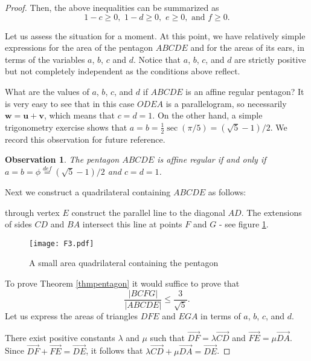 \documentclass [10pt,oneside]{amsart}
\theoremstyle{definition}
\theoremstyle{plain}
\newtheorem{obs}[df]{Observation}
\newcounter{exercise}
\begin{document}
\begin{proof}
Then, the above inequalities can be summarized as
\begin{equation}\label{cdef}
1-c\ge 0, \,\,1-d\ge 0,\,\,e\ge 0,\,\,\text{and}\,\, f\ge 0.
\end{equation}

Let us assess the situation for a moment. At this point, we have relatively simple expressions for the
area of the pentagon $ABCDE$ and for the areas of its ears, in terms of the variables $a$, $b$, $c$ and $d$.
Notice that $a$, $b$, $c$, and $d$ are strictly positive but not completely independent as the conditions above reflect.

What are the values of $a$, $b$, $c$, and $d$ if $ABCDE$ is an affine regular pentagon? It is very easy to see that in this case $ODEA$ is a parallelogram, so necessarily $\mathbf{w}=\mathbf{u}+\mathbf{v}$, which means that $c=d=1$.
On the other hand, a simple trigonometry exercise shows that $a=b=\frac{1}{2}\sec(\pi/5)=(\sqrt{5}-1)/2$.
We record this observation for future reference.
\begin{obs}\label{extremum}
The pentagon $ABCDE$ is affine regular if and only if $a=b=\phi\overset{def}{=}(\sqrt{5}-1)/2$ and $c=d=1$.
\end{obs}

Next we construct a quadrilateral containing $ABCDE$ as follows: 

through vertex $E$ construct the parallel line to the diagonal $AD$. 
The extensions of sides $CD$ and $BA$ intersect this line at points $F$ and $G$ - see figure \ref{fig3}.
\begin{figure}[ht]
\centering
\texttt{[image: F3.pdf]}
\vspace{-0.5cm}
\caption{\small{A small area quadrilateral containing the pentagon}}
\label{fig3}
\end{figure}


To prove Theorem \ref{thmpentagon} it would suffice to prove that
\begin{equation}\label{wts}
\frac{|BCFG|}{|ABCDE|}\le \frac{3}{\sqrt{5}}.
\end{equation}
Let us express the areas of triangles $DFE$ and $EGA$ in terms of $a$, $b$, $c$, and $d$.

There exist positive constants $\lambda$ and $\mu$ such that
$\overrightarrow{DF}=\lambda\overrightarrow{CD}$ and $\overrightarrow{FE}=\mu\overrightarrow{DA}$.
Since $\overrightarrow{DF}+\overrightarrow{FE}=\overrightarrow{DE}$, it follows that
$\lambda\overrightarrow{CD}+\mu\overrightarrow{DA}=\overrightarrow{DE}$.


\end{proof}
\end{document}
